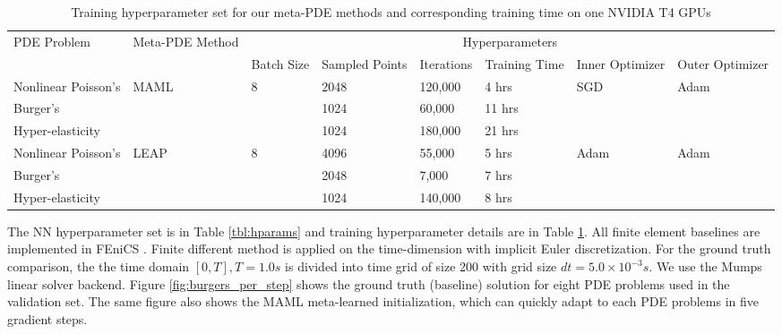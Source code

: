 \begin{table}[htbp]
\caption{\small 
Training hyperparameter set for our meta-PDE methods and corresponding training time on one NVIDIA T4 GPUs}
\label{tbl:training}
\centering
\begin{adjustbox}{max width=\textwidth}
\begin{tabular}{llllllll}
    \toprule
    PDE Problem & Meta-PDE Method & \multicolumn{6}{c}{Hyperparameters}  \\
    & & Batch Size & Sampled Points & Iterations & Training Time & Inner Optimizer & Outer Optimizer \\
    \midrule
    Nonlinear Poisson's & \multirow{3}{*}{MAML} & \multirow{3}{*}{8} & 2048 & 120,000 & 4 hrs & \multirow{3}{*}{SGD} & \multirow{3}{*}{Adam} \\
    Burger's &   &  & 1024 & 60,000 & 11 hrs  &  & \\
    Hyper-elasticity &   &  & 1024 & 180,000 & 21 hrs &  & \\
    \midrule
    Nonlinear Poisson's & \multirow{3}{*}{LEAP}  & \multirow{3}{*}{8} & 4096 & 55,000 & 5 hrs  &  \multirow{3}{*}{Adam} &  \multirow{3}{*}{Adam}\\
    Burger's &   &  & 2048 & 7,000 & 7 hrs &  & \\
    Hyper-elasticity &   &  & 1024 & 140,000 & 8 hrs &  & \\
    \bottomrule
  \end{tabular}
\end{adjustbox}
\end{table}

The NN hyperparameter set is in Table \ref{tbl:hparams} and training hyperparameter details are in Table \ref{tbl:training}. All finite element baselines are implemented in FEniCS \citep{LoggMardalEtAl2012a,AlnaesBlechta2015a}. Finite different method is applied on the time-dimension with implicit Euler discretization. For the ground truth comparison, the the time domain $[0, T], T = 1.0s$ is divided into time grid of size 200 with grid size $dt = 5.0\times10^{-3}s$. We use the Mumps linear solver backend. Figure \ref{fig:burgers_per_step} shows the ground truth (baseline) solution for eight PDE problems used in the validation set. The same figure also shows the MAML meta-learned initialization, which can quickly adapt to each PDE problems in five gradient steps. 

